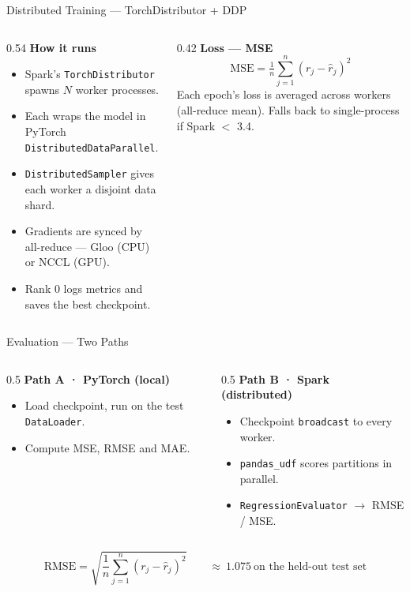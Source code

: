 \documentclass[aspectratio=169]{beamer}
\begin{document}
\begin{frame}{Distributed Training --- TorchDistributor + DDP}
\begin{columns}[T]
  \begin{column}{0.54\textwidth}
    \textbf{How it runs}
    \begin{itemize}
      \item Spark's \texttt{TorchDistributor} spawns $N$ worker processes.
      \item Each wraps the model in PyTorch \texttt{DistributedDataParallel}.
      \item \texttt{DistributedSampler} gives each worker a disjoint data shard.
      \item Gradients are synced by all-reduce --- Gloo (CPU) or NCCL (GPU).
      \item Rank 0 logs metrics and saves the best checkpoint.
    \end{itemize}
  \end{column}
  \begin{column}{0.42\textwidth}
    \textbf{Loss --- MSE}
    \[
    \text{MSE} = \tfrac{1}{n}\sum_{j=1}^{n}(r_j - \hat{r}_j)^2
    \]
    {\footnotesize Each epoch's loss is averaged across workers (all-reduce mean). Falls back to single-process if Spark $<$ 3.4.}
  \end{column}
\end{columns}
\end{frame}

\begin{frame}{Evaluation --- Two Paths}
\begin{columns}[T]
  \begin{column}{0.5\textwidth}
    \textbf{Path A · PyTorch (local)}
    \begin{itemize}
      \item Load checkpoint, run on the test \texttt{DataLoader}.
      \item Compute MSE, RMSE and MAE.
    \end{itemize}
  \end{column}
  \begin{column}{0.5\textwidth}
    \textbf{Path B · Spark (distributed)}
    \begin{itemize}
      \item Checkpoint \texttt{broadcast} to every worker.
      \item \texttt{pandas\_udf} scores partitions in parallel.
      \item \texttt{RegressionEvaluator} $\rightarrow$ RMSE / MSE.
    \end{itemize}
  \end{column}
\end{columns}

\vspace{0.25cm}
\[
\text{RMSE} = \sqrt{\frac{1}{n}\sum_{j=1}^{n}(r_j - \hat{r}_j)^2}
\qquad\approx\ 1.075\ \text{on the held-out test set}
\]
\end{frame}
\end{document}
